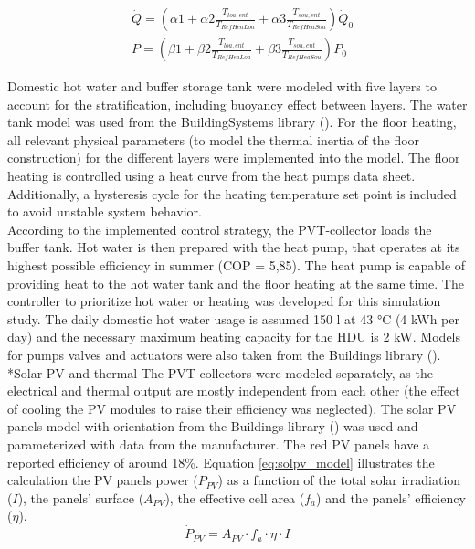 \documentclass[twocolumn, a4paper,10pt]{article}
\makeatletter
\renewcommand\subsection{\@startsection{subsection}{1}{\z@}{\z@}{\z@}{\normalfont\normalsize\bfseries}}
\renewcommand\subsection{\@startsection{subsection}{1}{\z@}{\z@}{0.1pt}{\normalfont\normalsize\bfseries}}
\makeatother
\begin{document}
\begin{equation}
\begin{aligned}
    &\dot{Q} = (\alpha1 + \alpha2 \frac{T_{loa,ent}}{T_{RefHeaLoa}} + \alpha3 \frac{T_{sou,ent}}{T_{RefHeaSou}}) \dot{Q}_0 \\
    &P= (\beta1 + \beta2 \frac{T_{loa,ent}}{T_{RefHeaLoa}} + \beta3 \frac{T_{sou,ent}}{T_{RefHeaSou}}) P_0
\label{eq:HPmodel}
\end{aligned}
\end{equation}

Domestic hot water and buffer storage tank were modeled with five layers to account for the stratification, including buoyancy effect between layers. The water tank model was used from the BuildingSystems library (\citet{NytschGeusen2012}). For the floor heating, all relevant physical parameters (to model the thermal inertia of the floor construction) for the different layers were implemented into the model. The floor heating is controlled using a heat curve from the heat pumps data sheet. Additionally, a hysteresis cycle for the heating temperature set point is included to avoid unstable system behavior.\\
According to the implemented control strategy, the PVT-collector loads the buffer tank. Hot water is then prepared with the heat pump, that operates at its highest possible efficiency in summer (COP = 5,85). The heat pump is capable of providing heat to the hot water tank and the floor heating at the same time. The controller to prioritize hot water or heating was developed for this simulation study. The daily domestic hot water usage is assumed 150 l at 43 °C (4 kWh per day) and the necessary maximum heating capacity for the HDU is 2 kW. Models for pumps valves and actuators were also taken from the Buildings library (\citet{Wetter2014}).\\


\subsection*{Solar PV and thermal}
The PVT collectors were modeled separately, as the electrical and thermal output are mostly independent from each other (the effect of cooling the PV modules to raise their efficiency was neglected). The solar PV panels model with orientation from the Buildings library (\citet{Wetter2014}) was used and parameterized with data from the manufacturer. The red PV panels have a reported efficiency of around 18\%. Equation \ref{eq:solpv_model} illustrates the calculation the PV panels power ($P_{PV}$) as a function of the total solar irradiation ($I$), the panels' surface ($A_{PV}$), the effective cell area ($f_a$) and the panels' efficiency ($\eta$).\\
\vspace{-1pt}
\begin{equation}
\dot{P}_{PV} = A_{PV} \cdot  f_{a} \cdot \eta \cdot I
\label{eq:solpv_model}
\end{equation}
\end{document}
